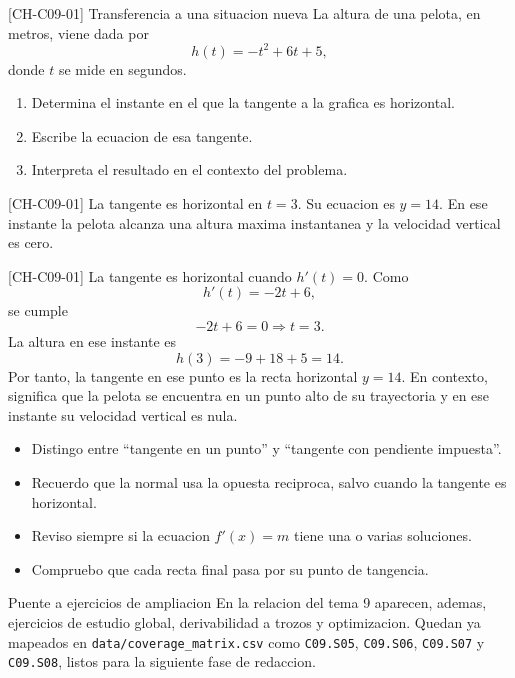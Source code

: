 \begin{challenge}{[CH-C09-01] Transferencia a una situacion nueva}
La altura de una pelota, en metros, viene dada por
\[
h(t)=-t^2+6t+5,
\]
donde \(t\) se mide en segundos.

\begin{enumerate}
  \item Determina el instante en el que la tangente a la grafica es horizontal.
  \item Escribe la ecuacion de esa tangente.
  \item Interpreta el resultado en el contexto del problema.
\end{enumerate}
\end{challenge}

\begin{shortanswer}{[CH-C09-01]}
La tangente es horizontal en \(t=3\). Su ecuacion es \(y=14\). En ese instante la pelota
alcanza una altura maxima instantanea y la velocidad vertical es cero.
\end{shortanswer}

\begin{fullsolution}{[CH-C09-01]}
La tangente es horizontal cuando \(h'(t)=0\). Como
\[
h'(t)=-2t+6,
\]
se cumple
\[
-2t+6=0 \Longrightarrow t=3.
\]
La altura en ese instante es
\[
h(3)=-9+18+5=14.
\]
Por tanto, la tangente en ese punto es la recta horizontal \(y=14\). En contexto, significa
que la pelota se encuentra en un punto alto de su trayectoria y en ese instante su velocidad
vertical es nula.
\end{fullsolution}

\begin{selfcheck}
\begin{itemize}
  \item Distingo entre ``tangente en un punto'' y ``tangente con pendiente impuesta''.
  \item Recuerdo que la normal usa la opuesta reciproca, salvo cuando la tangente es horizontal.
  \item Reviso siempre si la ecuacion \(f'(x)=m\) tiene una o varias soluciones.
  \item Compruebo que cada recta final pasa por su punto de tangencia.
\end{itemize}
\end{selfcheck}

\begin{extension}{Puente a ejercicios de ampliacion}
En la relacion del tema 9 aparecen, ademas, ejercicios de estudio global, derivabilidad a
trozos y optimizacion. Quedan ya mapeados en \texttt{data/coverage\_matrix.csv} como
\texttt{C09.S05}, \texttt{C09.S06}, \texttt{C09.S07} y \texttt{C09.S08}, listos para la
siguiente fase de redaccion.
\end{extension}
